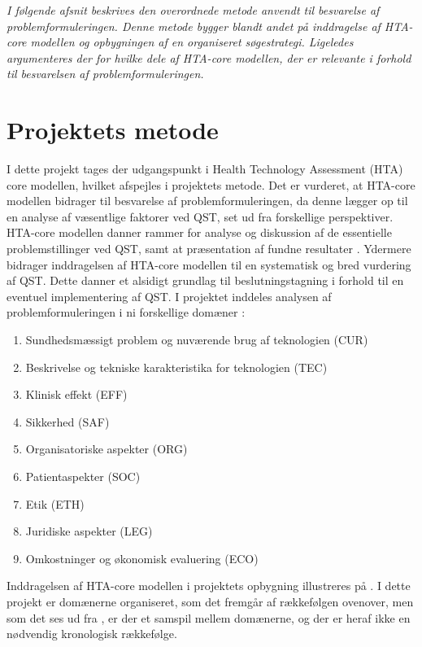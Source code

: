 \textit{I følgende afsnit beskrives den overordnede metode anvendt til besvarelse af problemformuleringen. Denne metode bygger blandt andet på inddragelse af HTA-core modellen og opbygningen af en organiseret søgestrategi. Ligeledes argumenteres der for hvilke dele af HTA-core modellen, der er relevante i forhold til besvarelsen af problemformuleringen.}

\section{Projektets metode}
I dette projekt tages der udgangspunkt i Health Technology Assessment (HTA) core modellen, hvilket afspejles i projektets metode. Det er vurderet, at HTA-core modellen bidrager til besvarelse af problemformuleringen, da denne lægger op til en analyse af væsentlige faktorer ved QST, set ud fra forskellige perspektiver. HTA-core modellen danner rammer for analyse og diskussion af de essentielle problemstillinger ved QST, samt at præsentation af fundne resultater \citep{HTAcore}. Ydermere bidrager inddragelsen af HTA-core modellen til en systematisk og bred vurdering af QST. Dette danner et alsidigt grundlag til beslutningstagning i forhold til en eventuel implementering af QST. \citep{metodehaandbogen} \citep{HTAcore} I projektet inddeles analysen af problemformuleringen i ni forskellige domæner \citep{HTAcore}:

\begin{enumerate}
\item Sundhedsmæssigt problem og nuværende brug af teknologien (CUR)
\item Beskrivelse og tekniske karakteristika for teknologien (TEC)
\item Klinisk effekt (EFF)
\item Sikkerhed (SAF)
\item Organisatoriske aspekter (ORG)
\item Patientaspekter (SOC)
\item Etik (ETH)
\item Juridiske aspekter (LEG)
\item Omkostninger og økonomisk evaluering (ECO)
\end{enumerate}

Inddragelsen af HTA-core modellen i projektets opbygning illustreres på . I dette projekt er domænerne organiseret, som det fremgår af rækkefølgen ovenover, men som det ses ud fra , er der et samspil mellem domænerne, og der er heraf ikke en nødvendig kronologisk rækkefølge.

